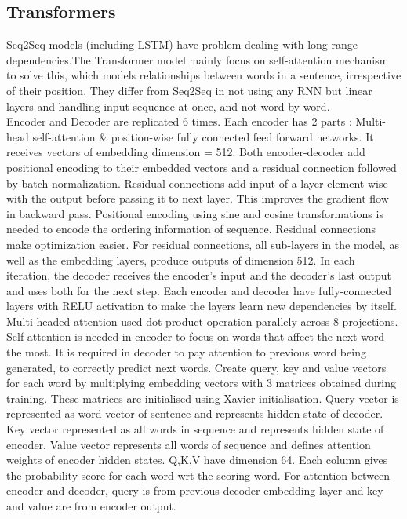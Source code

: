 \documentclass[11pt, oneside]{article}   	%
\begin{document}
\subsection{Transformers}
Seq2Seq models (including LSTM) have problem dealing with long-range dependencies.The Transformer model \cite{vaswani2017attention}  mainly focus on self-attention mechanism to solve this, which models relationships between words in a sentence, irrespective of their position. They differ from Seq2Seq in not using any RNN but linear layers and handling input sequence at once, and not word by word.\\
Encoder and Decoder are replicated 6 times. Each encoder has 2 parts : Multi-head self-attention \& position-wise fully connected feed forward networks. It receives vectors of embedding dimension = 512. Both encoder-decoder add positional encoding to their embedded vectors and a residual connection followed by batch normalization. Residual connections add input of a layer element-wise with the output before passing it to next layer. This improves the gradient flow in backward pass. Positional encoding using sine and cosine transformations is needed to encode the ordering information of sequence. Residual connections make optimization easier. For residual connections, all sub-layers in the model, as well as the embedding layers, produce outputs of dimension 512.
 In each iteration, the decoder receives the encoder’s input and the decoder’s last output and uses both for the next step. Each encoder and decoder have fully-connected layers with RELU activation to make the layers learn new dependencies by itself.\\
Multi-headed attention used dot-product operation parallely across 8 projections. Self-attention is needed in encoder to focus on words that affect the next word the most. It is required in decoder to pay attention to previous word being generated, to correctly predict next words. Create query, key and value vectors for each word by multiplying embedding vectors with 3 matrices obtained during training. These matrices are initialised using Xavier initialisation. Query vector is represented as word vector of sentence and represents hidden state of decoder. Key vector represented as all words in sequence and represents hidden state of encoder. Value vector represents all words of sequence and defines attention weights of encoder hidden states. Q,K,V have dimension 64. Each column gives the probability score for each word wrt the scoring word. For attention between encoder and decoder, query is from previous decoder embedding layer and key and value are from encoder output.
\end{document}
